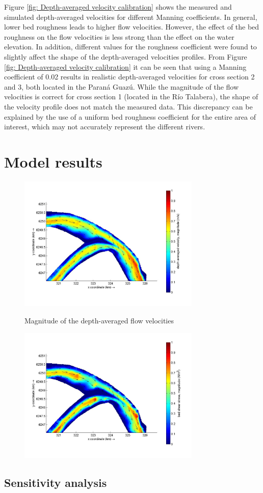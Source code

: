 Figure \ref{fig: Depth-averaged velocity calibration} shows the measured and simulated depth-averaged velocities for different Manning coefficients. In general, lower bed roughness leads to higher flow velocities. However, the effect of the bed roughness on the flow velocities is less strong than the effect on the water elevation. In addition, different values for the roughness coefficient were found to slightly affect the shape of the depth-averaged velocities profiles. From Figure \ref{fig: Depth-averaged velocity calibration} it can be seen that using a Manning coefficient of 0.02 results in realistic depth-averaged velocities for cross section 2 and 3, both located in the Paraná Guazú. While the magnitude of the flow velocities is correct for cross section 1 (located in the Río Talabera), the shape of the velocity profile does not match the measured data. This discrepancy can be explained by the use of a uniform bed roughness coefficient for the entire area of interest, which may not accurately represent the different rivers.

\section{Model results}


\begin{figure}[H]
    \centering
    \begin{minipage}[t]{0.48\linewidth}
        \centering
        \includegraphics[height=6.5cm]{figures/ch7/dav_confluence.jpg}
        \caption{Magnitude of the depth-averaged flow velocities}
        \label{fig: dav confluence}
    \end{minipage}
    \hfill
    \begin{minipage}[t]{0.48\linewidth}
        \centering
        \includegraphics[height=6.5cm]{figures/ch7/Bed_shear_confluence.jpg}
        \caption{}
        \label{fig: bed shear confluence}
    \end{minipage}
\end{figure}

\subsection{Sensitivity analysis}



